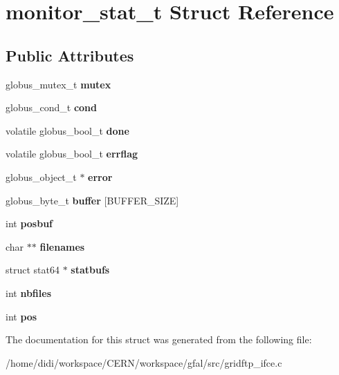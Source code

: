 \section{monitor\_\-stat\_\-t Struct Reference}
\label{structmonitor__stat__t}
\subsection*{Public Attributes}
\begin{DoxyCompactItemize}
\item 
globus\_\-mutex\_\-t {\bfseries mutex}\label{structmonitor__stat__t_a99fd9c2bde79375f0324664ee58ad456}

\item 
globus\_\-cond\_\-t {\bfseries cond}\label{structmonitor__stat__t_a9d75bea28923b9cae70a8b13efb4d89d}

\item 
volatile globus\_\-bool\_\-t {\bfseries done}\label{structmonitor__stat__t_af5a0e4859bdfddc20e80906d3de29e64}

\item 
volatile globus\_\-bool\_\-t {\bfseries errflag}\label{structmonitor__stat__t_aaadfa5b255778378a2664d2ec8077746}

\item 
globus\_\-object\_\-t $\ast$ {\bfseries error}\label{structmonitor__stat__t_ac0dcf7e8983a52e23fa37e492a5b0306}

\item 
globus\_\-byte\_\-t {\bfseries buffer} [BUFFER\_\-SIZE]\label{structmonitor__stat__t_ad71ba36e3b3ba82ecc4489c9d9bb2b30}

\item 
int {\bfseries posbuf}\label{structmonitor__stat__t_a30e8cefc6d353c47e50acf76af088f18}

\item 
char $\ast$$\ast$ {\bfseries filenames}\label{structmonitor__stat__t_a6a88b78b64814e2a82c29458d8cfab43}

\item 
struct stat64 $\ast$ {\bfseries statbufs}\label{structmonitor__stat__t_aad982054d47d0d36117be2342dd37700}

\item 
int {\bfseries nbfiles}\label{structmonitor__stat__t_a9040bd8e59b63ee07af6f6310568a42e}

\item 
int {\bfseries pos}\label{structmonitor__stat__t_a1e72e950f15c13d897e2aa49f004d118}

\end{DoxyCompactItemize}


The documentation for this struct was generated from the following file:\begin{DoxyCompactItemize}
\item 
/home/didi/workspace/CERN/workspace/gfal/src/gridftp\_\-ifce.c\end{DoxyCompactItemize}
